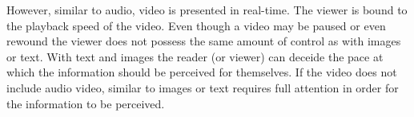 However, similar to audio, video is presented in real-time. The viewer is bound to the playback speed of the video. Even though a video may be paused or even rewound the viewer does not possess the same amount of control as with images or text. With text and images the reader (or viewer) can deceide the pace at which the information should be perceived for themselves. If the video does not include audio video, similar to images or text requires full attention in order for the information to be perceived.